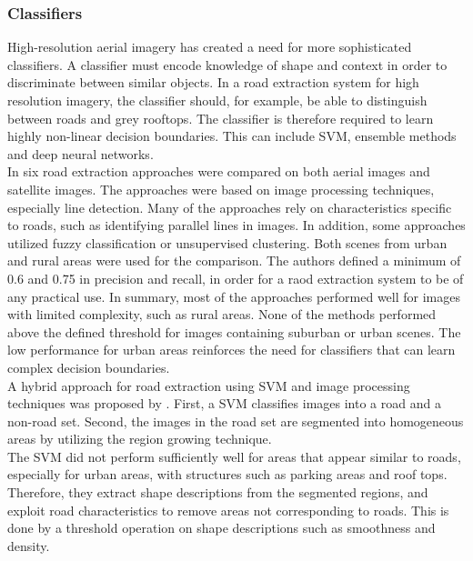 \subsubsection{Classifiers}
High-resolution aerial imagery has created a need for more sophisticated classifiers. A classifier must encode knowledge of shape and context in order to discriminate between similar objects. In a road extraction system for high resolution imagery, the classifier should, for example, be able to distinguish between roads and grey rooftops. The classifier is therefore required to learn highly non-linear decision boundaries. This can include \ac{SVM}, ensemble methods and deep neural networks.\\

In \cite{Mayer_road_test} six road extraction approaches were compared on both aerial images and satellite images. The approaches were based on image processing techniques, especially line detection. Many of the approaches rely on characteristics specific to roads, such as identifying parallel lines in images. In addition, some approaches utilized fuzzy classification or unsupervised clustering. Both scenes from urban and rural areas were used for the comparison. The authors defined a minimum of 0.6 and 0.75 in precision and recall, in order for a raod extraction system to be of any practical use. In summary, most of the approaches performed well for images with limited complexity, such as rural areas. None of the methods performed above the defined threshold for images containing suburban or urban scenes. The low performance for urban areas reinforces the need for classifiers that can learn complex decision boundaries.\\

A hybrid approach for road extraction using \ac{SVM} and image processing techniques was proposed by \cite{Song_road_extraction_svm}. First, a \ac{SVM} classifies images into a road and a non-road set. Second, the images in the road set are segmented into homogeneous areas by utilizing the region growing technique. \\

The \ac{SVM} did not perform sufficiently well for areas that appear similar to roads, especially for urban areas, with structures such as parking areas and roof tops. Therefore, they extract shape descriptions from the segmented regions, and exploit road characteristics to remove areas not corresponding to roads. This is done by a threshold operation on shape descriptions such as smoothness and density.\\

